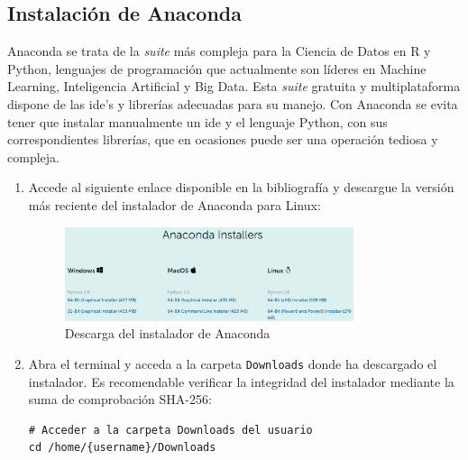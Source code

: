 \subsection{Instalación de Anaconda}
\label{subsec:instalacion-anaconda}

Anaconda se trata de la \textit{suite} más compleja para la Ciencia de Datos en R y Python, lenguajes de programación que actualmente son líderes en Machine Learning, Inteligencia Artificial y Big Data. Esta \textit{suite} gratuita y multiplataforma dispone de las \gls{ide}'s y librerías adecuadas para su manejo. Con Anaconda se evita tener que instalar manualmente un \gls{ide} y el lenguaje Python, con sus correspondientes librerías, que en ocasiones puede ser una operación tediosa y compleja.

\begin{enumerate}
    \item Accede al siguiente enlace \cite{inst-conda} disponible en la bibliografía y descargue la versión más reciente del instalador de Anaconda para Linux:
    
    \begin{figure}[ht]
    \centering
    \includegraphics[width=0.8\textwidth]{img/appendix/C/anaconda-installer.png}
    \caption{\label{fig:anaconda-download}Descarga del instalador de Anaconda \cite{inst-conda}}
    \end{figure}

    \item Abra el terminal y acceda a la carpeta \texttt{Downloads} donde ha descargado el instalador. Es recomendable verificar la integridad del instalador mediante la suma de comprobación SHA-256:
    
    \vspace{0.5cm}
    
    
\begin{lstlisting}[language=iPython,caption=Verificación de la integridad de la instalación de Anaconda,captionpos=b,label={lst:verificar-sha256}]
# Acceder a la carpeta Downloads del usuario
cd /home/{username}/Downloads


\end{lstlisting}
\end{enumerate}
